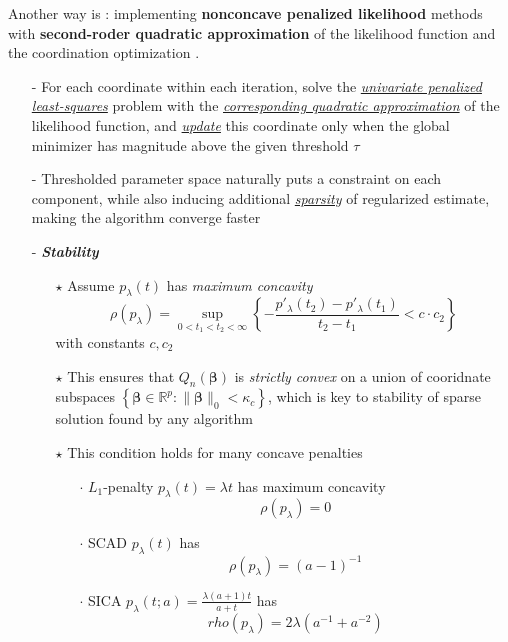 \documentclass[twoside]{article}
\begin{document}
Another way is : implementing \textbf{nonconcave penalized likelihood} methods with \textbf{second-roder quadratic approximation} of the likelihood function and the coordination optimization \citep{fan2011nonconcave}.
\begin{itemize}
    \item[-] For each coordinate within each iteration, solve the \underline{\textit{univariate penalized least-squares}} problem with the \textit{\underline{corresponding quadratic approximation}} of the likelihood function, and \textit{\underline{update}} this coordinate only when the global minimizer has magnitude above the given threshold $\tau$ 
    \item[-] Thresholded parameter space naturally puts a constraint on each component, while also inducing additional \textit{\underline{sparsity}} of regularized estimate, making the algorithm converge faster
    \item[-] \textbf{\textit{Stability}}
    \begin{itemize}
        \item[$\star$] Assume $p_{\lambda}(t)$ has \textit{maximum concavity} $$ \rho(p_{\lambda}) = \sup_{0<t_1<t_2<\infty} \left\{ - \frac{p'_{\lambda}(t_2)-p'_{\lambda}(t_1)}{t_2-t_1} < c\cdot c_2 \right\} $$ with constants $c,c_2$
        \item[$\star$] This ensures that $Q_n(\boldsymbol{\beta})$  is \textit{strictly convex} on a union of cooridnate subspaces $\left\{ \boldsymbol{\beta}\in\mathbb{R}^p: \lVert \boldsymbol{\beta} \rVert _0 < \kappa_c \right\}$, which is key to stability of sparse solution found by any algorithm
        \item[$\star$] This condition holds for many concave penalties 
        \begin{itemize}
            \item[$\cdot$] $L_1$-penalty $p_{\lambda}(t)=\lambda t$ has maximum concavity $$\rho(p_{\lambda})=0$$
            \item[$\cdot$] SCAD $p_{\lambda}(t)$ has $$\rho(p_{\lambda})=(a-1)^{-1}$$ 
            \item[$\cdot$] SICA $p_{\lambda}(t;a) = \frac{\lambda(a+1)t}{a+t}$ has $$rho(p_{\lambda})=2\lambda(a^{-1}+a^{-2})$$  
        \end{itemize}
    \end{itemize}
\end{itemize}

\newpage


\end{document}

